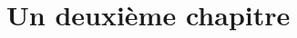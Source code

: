 

\begin{comment}

\documentclass[a4paper, 11pt, twoside, fleqn]{memoir}





	\openleft %

\end{comment}

	\chapter{Un deuxième  chapitre}
	\ChapFrame %
	\lipsum[1-3]
	
%

